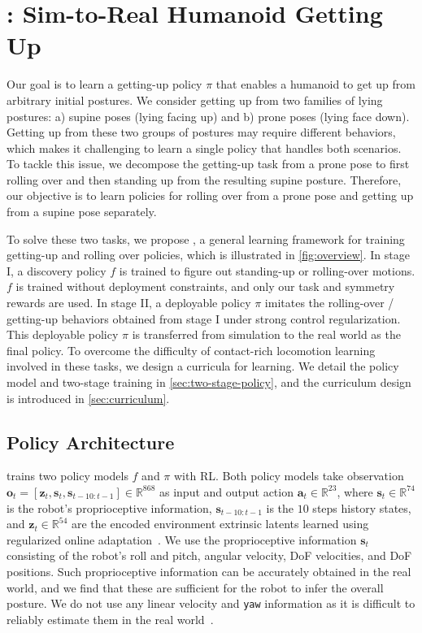 \section{\ours: Sim-to-Real Humanoid Getting Up}
Our goal is to learn a getting-up policy $\pi$ that enables a humanoid to get up from arbitrary initial postures. We consider getting up from two families of lying postures: a) supine poses (\ie lying facing up) and b) prone poses (\ie lying face down).
Getting up from these two groups of postures may require different behaviors, which makes it challenging to learn a single policy that handles both scenarios.
To tackle this issue, we decompose the getting-up task from a prone pose to first rolling over and then standing up from the resulting supine posture. Therefore, our objective is to learn policies for rolling over from a prone pose and getting up from a supine pose separately.

To solve these two tasks, we propose \ours, a general learning framework for training getting-up and rolling over policies, which is illustrated in \cref{fig:overview}.
In stage I, a discovery policy $f$ is trained to figure out standing-up or rolling-over motions.
$f$ is trained without deployment constraints, and only our task and symmetry rewards are used.
In stage II, a deployable policy $\pi$ imitates the rolling-over / getting-up behaviors obtained from stage I under strong control regularization.
This deployable policy $\pi$ is transferred from simulation to the real world as the final policy.
To overcome the difficulty of contact-rich locomotion learning involved in these tasks, we design a curricula for learning. We detail the policy model and two-stage training in \cref{sec:two-stage-policy}, and the curriculum design is introduced in \cref{sec:curriculum}.


\subsection{Policy Architecture}\label{sec:policy}
\ours trains two policy models $f$ and $\pi$ with RL.
Both policy models take observation $\mathbf{o}_t = [\mathbf{z}_t, \mathbf{s}_t, \mathbf{s}_{t-10:t-1}] \in \mathbb{R}^{868}$ as input and output action $\mathbf{a}_t \in \mathbb{R}^{23}$, where $\mathbf{s}_t \in \mathbb{R}^{74}$ is the robot's proprioceptive information, $\mathbf{s}_{t-10:t-1}$ is the $10$ steps history states, and $\mathbf{z}_t\in\mathbb{R}^{54}$ are the encoded environment extrinsic latents learned using regularized online adaptation~\cite{DeepWholeBodyControl22}.
We use the proprioceptive information $\mathbf{s}_t$ consisting of the robot's roll and pitch, angular velocity, DoF velocities, and DoF positions.
Such proprioceptive information can be accurately obtained in the real world, and we find that these are sufficient for the robot to infer the overall posture.
We do not use any linear velocity and \texttt{yaw} information as it is difficult to reliably estimate them in the real world~\cite{OmniH2O24}. 

